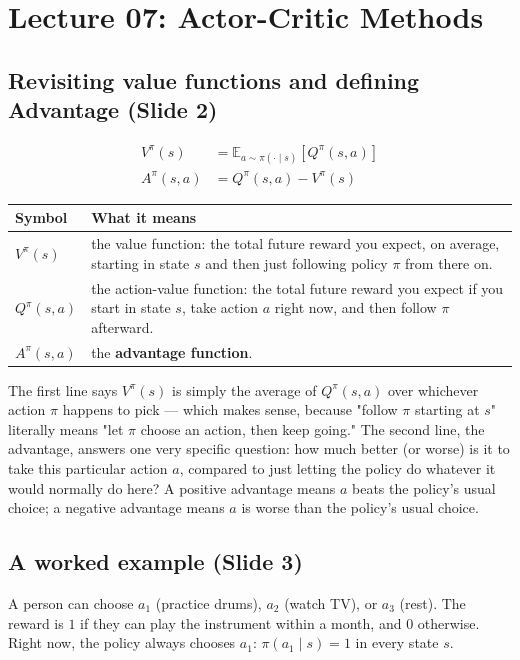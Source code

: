 \documentclass[11pt]{article}
\begin{document}
\section{Lecture 07: Actor-Critic Methods}

\subsection{Revisiting value functions and defining Advantage (Slide 2)}
\begin{align*}
V^\pi(s) &= \mathbb{E}_{a\sim\pi(\cdot\mid s)}[Q^\pi(s,a)] \\
A^\pi(s,a) &= Q^\pi(s,a) - V^\pi(s)
\end{align*}
\begin{center}
\begin{tabular}{@{} >{\raggedright\arraybackslash}p{} >{\raggedright\arraybackslash}p{} @{}}
\toprule
\textbf{Symbol} & \textbf{What it means} \\
\midrule
$V^\pi(s)$ & the value function: the total future reward you expect, on average, starting in state $s$ and then just following policy $\pi$ from there on. \\
$Q^\pi(s,a)$ & the action-value function: the total future reward you expect if you start in state $s$, take action $a$ right now, and then follow $\pi$ afterward. \\
$A^\pi(s,a)$ & the \textbf{advantage function}. \\
\bottomrule
\end{tabular}
\end{center}

The first line says $V^\pi(s)$ is simply the average of $Q^\pi(s,a)$ over whichever action $\pi$ happens to pick --- which makes sense, because "follow $\pi$ starting at $s$" literally means "let $\pi$ choose an action, then keep going." The second line, the advantage, answers one very specific question: how much better (or worse) is it to take this particular action $a$, compared to just letting the policy do whatever it would normally do here? A positive advantage means $a$ beats the policy's usual choice; a negative advantage means $a$ is worse than the policy's usual choice.

\subsection{A worked example (Slide 3)}
A person can choose $a_1$ (practice drums), $a_2$ (watch TV), or $a_3$ (rest). The reward is $1$ if they can play the instrument within a month, and $0$ otherwise. Right now, the policy always chooses $a_1$: $\pi(a_1\mid s) = 1$ in every state $s$.
\end{document}
